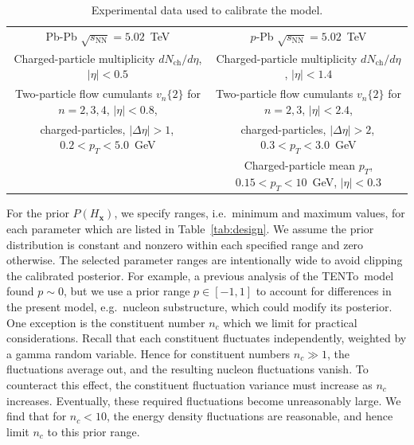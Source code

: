 \documentclass[aps,prc,reprint,amsmath,nofootinbib]{revtex4-1}
\newcommand{\trento}{T\raisebox{-0.5ex}{R}ENTo}
\newcommand{\sqrts}{\sqrt{s_\mathrm{NN}}}
\newcommand{\nch}{N_\text{ch}}
\newcommand{\vnk}[2]{v_#1\{#2\}}
\newcommand{\xv}{\mathbf x}
\newcommand{\paddedhline}{\noalign{\smallskip}\hline\noalign{\smallskip}}
\begin{document}
\begin{table}
  \caption{
    \label{tab:observables}
    Experimental data used to calibrate the model.
  }
  \begin{ruledtabular}
  \begin{tabular}{cc}
    Pb-Pb $\sqrts=5.02$~TeV & $p$-Pb $\sqrts=5.02$~TeV \\
    \paddedhline
    Charged-particle multiplicity $d\nch/d\eta$, $|\eta| < 0.5$ \cite{Adam:2015ptt} & Charged-particle multiplicity $d\nch/d\eta$, $|\eta| < 1.4$ \cite{Adam:2014qja} \\
    \noalign{\smallskip}
  Two-particle flow cumulants  $\vnk{n}{2}$ for $n=2,3,4$, $|\eta| < 0.8$,  & Two-particle flow cumulants $\vnk{n}{2}$ for $n=2,3$, $|\eta| < 2.4$, \\
    charged-particles, $|\Delta\eta| > 1$,\, $0.2 < p_T < 5.0$~GeV \cite{Adam:2016izf} & charged-particles, $|\Delta\eta| > 2$,\, $0.3 < p_T < 3.0$~GeV \cite{Chatrchyan:2013nka}\\
    \noalign{\smallskip}
    & Charged-particle mean $p_T$, $0.15 < p_T < 10$~GeV, $|\eta| < 0.3$ \cite{Abelev:2013bla}\\
  \end{tabular}
  \end{ruledtabular}
\end{table}

For the prior $P(H_\xv)$, we specify ranges, i.e.\ minimum and maximum values, for each parameter which are listed in Table~\ref{tab:design}.
We assume the prior distribution is constant and nonzero within each specified range and zero otherwise.
The selected parameter ranges are intentionally wide to avoid clipping the calibrated posterior.
For example, a previous analysis of the \trento\ model \cite{Bernhard:2016tnd} found $p \sim 0$, but we use a prior range $p \in [-1, 1]$ to account for differences in the present model, e.g.\ nucleon substructure, which could modify its posterior.
One exception is the constituent number $n_c$ which we limit for practical considerations.
Recall that each constituent fluctuates independently, weighted by a gamma random variable.
Hence for constituent numbers $n_c \gg 1$, the fluctuations average out, and the resulting nucleon fluctuations vanish.
To counteract this effect, the constituent fluctuation variance must increase as $n_c$ increases.
Eventually, these required fluctuations become unreasonably large.
We find that for $n_c < 10$, the energy density fluctuations are reasonable, and hence limit $n_c$ to this prior range.
\end{document}
